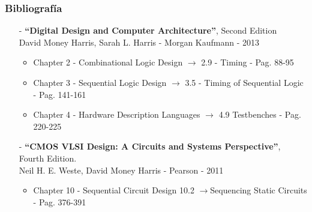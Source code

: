 \documentclass[aspectratio=169]{beamer}
\begin{document}
\begin{frame}[fragile]
    \frametitle{Bibliografía}
    \begin{itemize}
     \setlength\itemsep{0.0cm}
     
    \item[-] \textbf{``Digital Design and Computer Architecture''}, Second Edition\\
    David Money Harris, Sarah L. Harris - Morgan Kaufmann - 2013\\    
        \begin{itemize}
        \item Chapter 2 - Combinational Logic Design $\rightarrow$ 2.9 - Timing - Pag. 88-95
        \item Chapter 3 - Sequential Logic Design $\rightarrow$ 3.5 - Timing of Sequential Logic - Pag. 141-161
        \item Chapter 4 - Hardware Description Languages $\rightarrow$ 4.9 Testbenches - Pag. 220-225
        \end{itemize}

    \item[-] \textbf{``CMOS VLSI Design: A Circuits and Systems Perspective''}, Fourth Edition.\\
    Neil H. E. Weste, David Money Harris - Pearson - 2011\\
        \begin{itemize}
        \item Chapter 10 - Sequential Circuit Design 10.2 $\rightarrow$Sequencing Static Circuits - Pag. 376-391
        \end{itemize}


\end{itemize}
\end{frame}
\end{document}
